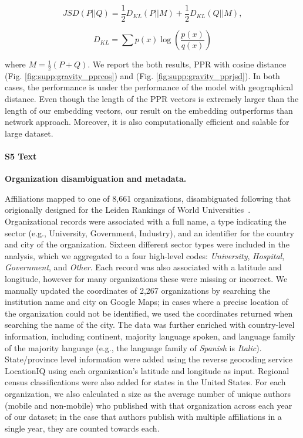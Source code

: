 \documentclass[12pt]{article} %
\begin{document}
\begin{equation}
	\label{eq:JSD}
	JSD(P||Q) = \frac{1}{2}D_{KL}(P||M) + \frac{1}{2}D_{KL}(Q||M),
\end{equation}

\begin{equation}
	\label{eq:KL}
	D_{KL} = \sum p(x)\log(\frac{p(x)}{q(x)})
\end{equation}

where $M=\frac{1}{2}(P+Q)$. We report the both results, PPR with cosine distance (Fig. \ref{fig:supp:gravity_pprcos}) and (Fig. \ref{fig:supp:gravity_pprjsd}). In both cases, the performance is under the performance of the model with geographical distance. Even though the length of the PPR vectors is extremely larger than the length of our embedding vectors, our result on the embedding outperforms than network approach. Moreover, it is also computationally efficient and salable for large dataset.


%
\paragraph*{S5 Text}
\label{si:text:organizations}
{\bf Organization disambiguation and metadata.}

Affiliations mapped to one of 8,661 organizations, disambiguated following that origionally designed for the Leiden Rankings of World Universities~\autocite{waltman2012leidenrankings}.
Organizational records were associated with a full name, a type indicating the sector (e.g., University, Government, Industry), and an identifier for the country and city of the organization.
Sixteen different sector types were included in the analysis, which we aggregated to a four high-level codes: \textit{University}, \textit{Hospital}, \textit{Government}, and \textit{Other}.
Each record was also associated with a latitude and longitude, however for many organizations these were missing or incorrect. We manually updated the coordinates of 2,267 organizations by searching the institution name and city on Google Maps;
in cases where a precise location of the organization could not be identified, we used the coordinates returned when searching the name of the city.
The data was further enriched with country-level information, including continent, majority language spoken, and language family of the majority language (e.g., the language family of \textit{Spanish} is \textit{Italic}).
State/province level  information were added using the reverse geocoding service LocationIQ using each organization's latitude and longitude as input.
Regional census classifications were also added for states in the United States.
For each organization, we also calculated a size as the average number of unique authors (mobile and non-mobile) who published with that organization across each year of our dataset;
in the case that authors publish with multiple affiliations in a single year, they are counted towards each.
\end{document}
